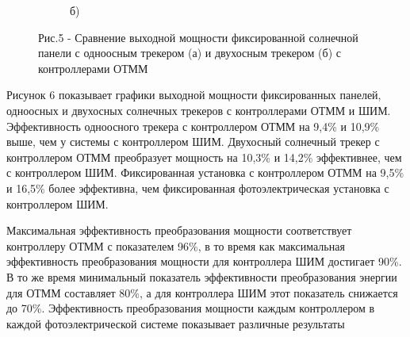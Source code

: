 \begin{figure}[H]
\begin{subfigure}[b]{0.45\textwidth}
        \caption*{б)}
    \end{subfigure}
    \caption*{Рис.5 - Сравнение выходной мощности фиксированной солнечной панели с одноосным трекером (а) и двухосным трекером (б) с контроллерами ОТММ}
\end{figure}

\begin{multicols}{2}
Рисунок 6 показывает графики выходной мощности фиксированных панелей,
одноосных и двухосных солнечных трекеров с контроллерами ОТММ и ШИМ.
Эффективность одноосного трекера с контроллером ОТММ на 9,4\% и 10,9\%
выше, чем у системы с контроллером ШИМ. Двухосный солнечный трекер с
контроллером ОТММ преобразует мощность на 10,3\% и 14,2\% эффективнее,
чем с контроллером ШИМ. Фиксированная установка с контроллером ОТММ на
9,5\% и 16,5\% более эффективна, чем фиксированная фотоэлектрическая
установка с контроллером ШИМ.

Максимальная эффективность преобразования мощности соответствует
контроллеру ОТММ с показателем 96\%, в то время как максимальная
эффективность преобразования мощности для контроллера ШИМ достигает
90\%. В то же время минимальный показатель эффективности преобразования
энергии для ОТММ составляет 80\%, а для контроллера ШИМ этот показатель
снижается до 70\%. Эффективность преобразования мощности каждым
контроллером в каждой фотоэлектрической системе показывает различные
результаты
\end{multicols}

